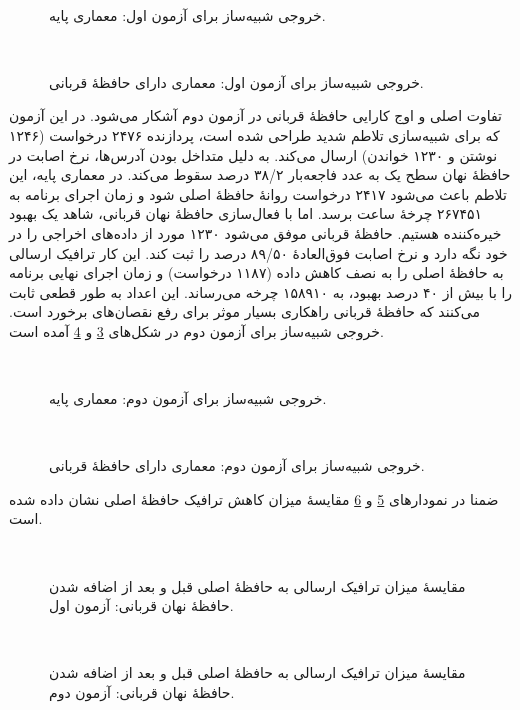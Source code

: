 \begin{figure}[ht]
	‫
	\caption{خروجی شبیه‌ساز برای آزمون اول: معماری پایه.}
	\label{test1}
\end{figure}

\begin{figure}[ht]
	‫
	\caption{خروجی شبیه‌ساز برای آزمون اول: معماری دارای حافظهٔ قربانی.}
	\label{test1_VC}
\end{figure}

تفاوت اصلی و اوج کارایی حافظهٔ قربانی در آزمون دوم آشکار می‌شود. در این آزمون که برای شبیه‌سازی تلاطم شدید طراحی شده است، پردازنده ۲۴۷۶ درخواست (۱۲۴۶ نوشتن و ۱۲۳۰ خواندن) ارسال می‌کند. به دلیل متداخل بودن آدرس‌ها، نرخ اصابت در حافظهٔ نهان سطح یک به عدد فاجعه‌بار ۳۸/۲ درصد سقوط می‌کند. در معماری پایه، این تلاطم باعث می‌شود ۲۴۱۷ درخواست روانهٔ حافظهٔ اصلی شود و زمان اجرای برنامه به ۲۶۷۴۵۱ چرخهٔ ساعت برسد. 
اما با فعال‌سازی حافظهٔ نهان قربانی، شاهد یک بهبود خیره‌کننده هستیم. حافظهٔ قربانی موفق می‌شود ۱۲۳۰ مورد از داده‌های اخراجی را در خود نگه دارد و نرخ اصابت فوق‌العادهٔ ۸۹/۵۰ درصد را ثبت کند. این کار ترافیک ارسالی به حافظهٔ اصلی را به نصف کاهش داده (۱۱۸۷ درخواست) و زمان اجرای نهایی برنامه را با بیش از ۴۰ درصد بهبود، به ۱۵۸۹۱۰ چرخه می‌رساند. این اعداد به طور قطعی ثابت می‌کنند که حافظهٔ قربانی راهکاری بسیار موثر برای رفع نقصان‌های برخورد است. 
خروجی شبیه‌ساز برای آزمون دوم در شکل‌های \ref{test2} و \ref{test2_VC} آمده است.

\begin{figure}[ht]
	‫
	\caption{خروجی شبیه‌ساز برای آزمون دوم: معماری پایه.}
	\label{test2}
\end{figure}

\begin{figure}[ht]
	‫
	\caption{خروجی شبیه‌ساز برای آزمون دوم: معماری دارای حافظهٔ قربانی.}
	\label{test2_VC}
\end{figure}

ضمنا در نمودارهای \ref{test1chart} و \ref{test2chart} مقایسهٔ میزان کاهش ترافیک حافظهٔ اصلی نشان داده شده است.

\begin{figure}[ht]
	‫
	\caption{مقایسهٔ میزان ترافیک ارسالی به حافظهٔ اصلی قبل و بعد از اضافه شدن حافظهٔ نهان قربانی: آزمون اول.}
	\label{test1chart}
\end{figure}

\begin{figure}[ht]
	‫
	\caption{مقایسهٔ میزان ترافیک ارسالی به حافظهٔ اصلی قبل و بعد از اضافه شدن حافظهٔ نهان قربانی: آزمون دوم.}
	\label{test2chart}
\end{figure}


